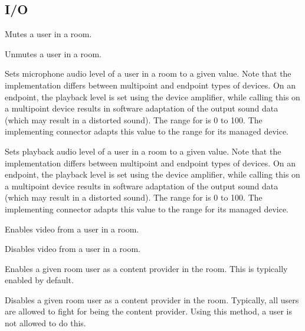 \subsection{I/O}
\begin{Api}

Mutes a user in a room.

Unmutes a user in a room.

Sets microphone audio level of a user in a room to a given value. Note that the implementation differs between multipoint and endpoint types of devices. On an endpoint, the playback level is set using the device amplifier, while calling this on a multipoint device results in software adaptation of the output sound data (which may result in a distorted sound). The range for  is 0 to 100. The implementing connector adapts this value to the range for its managed device.

Sets playback audio level of a user in a room to a given value. Note that the implementation differs between multipoint and endpoint types of devices. On an endpoint, the playback level is set using the device amplifier, while calling this on a multipoint device results in software adaptation of the output sound data (which may result in a distorted sound). The range for  is 0 to 100. The implementing connector adapts this value to the range for its managed device.

Enables video from a user in a room.

Disables video from a user in a room.

Enables a given room user as a content provider in the room. This is typically enabled by default.

Disables a given room user as a content provider in the room. Typically, all users are allowed to fight for being the content provider. Using this method, a user is not allowed to do this.

\end{Api}


